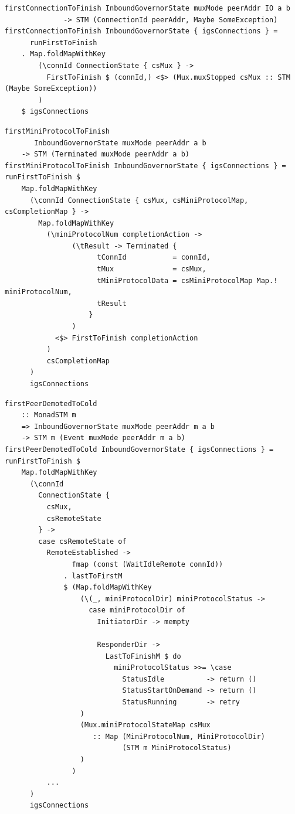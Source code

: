 \documentclass[t,dvipsnames,hyperref={colorlinks,citecolor=NavyBlue,linkcolor=NavyBlue,anchorcolor=NavyBlue,urlcolor=NavyBlue}]{beamer}
\begin{document}
\begin{frame}[fragile]
  \begin{verbatim}
firstConnectionToFinish InboundGovernorState muxMode peerAddr IO a b
              -> STM (ConnectionId peerAddr, Maybe SomeException)
firstConnectionToFinish InboundGovernorState { igsConnections } =
      runFirstToFinish
    . Map.foldMapWithKey
        (\connId ConnectionState { csMux } ->
          FirstToFinish $ (connId,) <$> (Mux.muxStopped csMux :: STM (Maybe SomeException))
        )
    $ igsConnections
  \end{verbatim}

  \begin{verbatim}
firstMiniProtocolToFinish
       InboundGovernorState muxMode peerAddr a b
    -> STM (Terminated muxMode peerAddr a b)
firstMiniProtocolToFinish InboundGovernorState { igsConnections } = runFirstToFinish $
    Map.foldMapWithKey
      (\connId ConnectionState { csMux, csMiniProtocolMap, csCompletionMap } ->
        Map.foldMapWithKey
          (\miniProtocolNum completionAction ->
                (\tResult -> Terminated {
                      tConnId           = connId,
                      tMux              = csMux,
                      tMiniProtocolData = csMiniProtocolMap Map.! miniProtocolNum,
                      tResult
                    }
                )
            <$> FirstToFinish completionAction
          )
          csCompletionMap
      )
      igsConnections
  \end{verbatim}
\end{frame}

\begin{frame}[fragile]
  \begin{verbatim}
firstPeerDemotedToCold
    :: MonadSTM m
    => InboundGovernorState muxMode peerAddr m a b
    -> STM m (Event muxMode peerAddr m a b)
firstPeerDemotedToCold InboundGovernorState { igsConnections } = runFirstToFinish $
    Map.foldMapWithKey
      (\connId
        ConnectionState {
          csMux,
          csRemoteState
        } ->
        case csRemoteState of
          RemoteEstablished ->
                fmap (const (WaitIdleRemote connId))
              . lastToFirstM
              $ (Map.foldMapWithKey
                  (\(_, miniProtocolDir) miniProtocolStatus ->
                    case miniProtocolDir of
                      InitiatorDir -> mempty

                      ResponderDir ->
                        LastToFinishM $ do
                          miniProtocolStatus >>= \case
                            StatusIdle          -> return ()
                            StatusStartOnDemand -> return ()
                            StatusRunning       -> retry
                  )
                  (Mux.miniProtocolStateMap csMux
                     :: Map (MiniProtocolNum, MiniProtocolDir)
                            (STM m MiniProtocolStatus)
                  )
                )
          ...
      )
      igsConnections
  \end{verbatim}
\end{frame}
\end{document}
